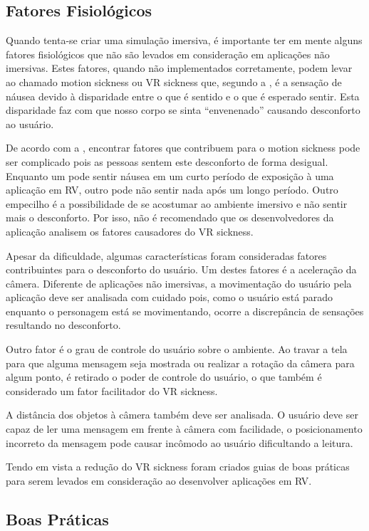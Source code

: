 \subsection{Fatores Fisiológicos}
\label{ss.fatoresfisiologicos}
Quando tenta-se criar uma simulação imersiva, é importante ter em mente alguns fatores fisiológicos que não são levados em consideração em aplicações não imersivas. Estes fatores, quando não implementados corretamente, podem levar ao chamado motion sickness ou VR sickness que, segundo a , é a sensação de náusea devido à disparidade entre o que é sentido e o que é esperado sentir. Esta disparidade faz com que nosso corpo se sinta “envenenado” causando desconforto ao usuário. 

De acordo com a , encontrar fatores que contribuem para o motion sickness pode ser complicado pois as pessoas sentem este desconforto de forma desigual. Enquanto um pode sentir náusea em um curto período de exposição à uma aplicação em RV, outro pode não sentir nada após um longo período. Outro empecilho é a possibilidade de se acostumar ao ambiente imersivo e não sentir mais o desconforto. Por isso, não é recomendado que os desenvolvedores da aplicação analisem os fatores causadores do VR sickness.

Apesar da dificuldade, algumas características foram consideradas fatores contribuintes para o desconforto do usuário. Um destes fatores é a aceleração da câmera. Diferente de aplicações não imersivas, a movimentação do usuário pela aplicação deve ser analisada com cuidado pois, como o usuário está parado enquanto o personagem está se movimentando, ocorre a discrepância de sensações resultando no desconforto.

Outro fator é o grau de controle do usuário sobre o ambiente. Ao travar a tela para que alguma mensagem seja mostrada ou realizar a rotação da câmera para algum ponto, é retirado o poder de controle do usuário, o que também é considerado um fator facilitador do VR sickness.

A distância dos objetos à câmera também deve ser analisada. O usuário deve ser capaz de ler uma mensagem em frente à câmera com facilidade, o posicionamento incorreto da mensagem pode causar incômodo ao usuário dificultando a leitura.

Tendo em vista a redução do VR sickness foram criados guias de boas práticas para serem levados em consideração ao desenvolver aplicações em RV.

\subsection{Boas Práticas}
\label{ss.boaspraticas}


